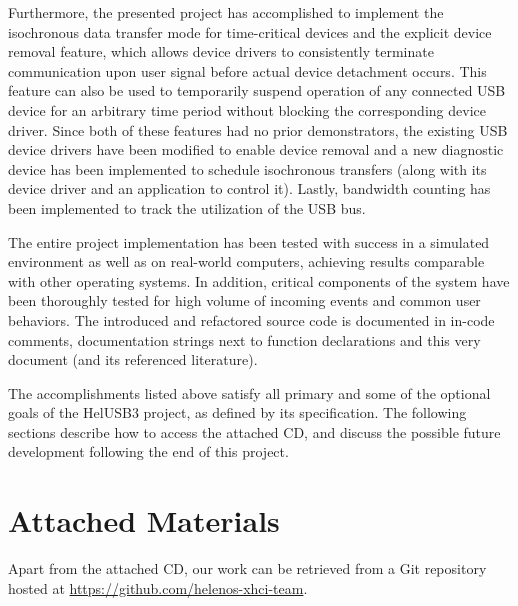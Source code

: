 Furthermore, the presented project has accomplished to implement the isochronous
data transfer mode for time-critical devices and the explicit device removal
feature, which allows device drivers to consistently terminate communication
upon user signal before actual device detachment occurs. This feature can also
be used to temporarily suspend operation of any connected USB device for an
arbitrary time period without blocking the corresponding device driver. Since
both of these features had no prior demonstrators, the existing USB device
drivers have been modified to enable device removal and a new diagnostic device
has been implemented to schedule isochronous transfers (along with its device
driver and an application to control it). Lastly, bandwidth counting has been
implemented to track the utilization of the USB bus.

The entire project implementation has been tested with success in a simulated
environment as well as on real-world computers, achieving results comparable
with other operating systems. In addition, critical components of the system
have been thoroughly tested for high volume of incoming events and common user
behaviors. The introduced and refactored source code is documented in in-code
comments, documentation strings next to function declarations and this very
document (and its referenced literature).

The accomplishments listed above satisfy all primary and some of the optional
goals of the HelUSB3 project, as defined by its specification. The following
sections describe how to access the attached CD, and discuss the possible future
development following the end of this project.


\section{Attached Materials}

Apart from the attached CD, our work can be retrieved from a Git repository
hosted at \href{https://github.com/helenos-xhci-team}{https://github.com/helenos-xhci-team}.

